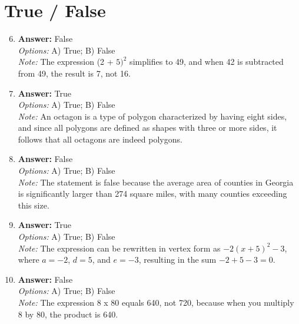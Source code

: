 \documentclass[12pt]{article}
\begin{document}
\section*{True / False}
\begin{enumerate}[label=\arabic*.]
\setcounter{enumi}{5}
\item \textbf{Answer:} False
\\ \textit{Options:} A) True; B) False
\\ \textit{Note:} The expression (2 + $5)^2$ simplifies to 49, and when 42 is subtracted from 49, the result is 7, not 16.
\item \textbf{Answer:} True
\\ \textit{Options:} A) True; B) False
\\ \textit{Note:} An octagon is a type of polygon characterized by having eight sides, and since all polygons are defined as shapes with three or more sides, it follows that all octagons are indeed polygons.
\item \textbf{Answer:} False
\\ \textit{Options:} A) True; B) False
\\ \textit{Note:} The statement is false because the average area of counties in Georgia is significantly larger than 274 square miles, with many counties exceeding this size.
\item \textbf{Answer:} True
\\ \textit{Options:} A) True; B) False
\\ \textit{Note:} The expression can be rewritten in vertex form as $-2(x+5)^2 - 3$, where $a = -2$, $d = 5$, and $e = -3$, resulting in the sum $-2 + 5 - 3 = 0$.
\item \textbf{Answer:} False
\\ \textit{Options:} A) True; B) False
\\ \textit{Note:} The expression 8 x 80 equals 640, not 720, because when you multiply 8 by 80, the product is 640.
\end{enumerate}
\end{document}
